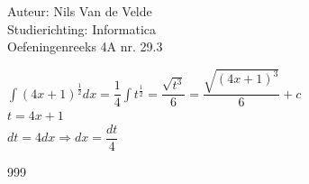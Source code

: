 \documentclass[a4paper]{article}
\begin{document}
  
\noindent \large Auteur: Nils Van de Velde \\
\noindent \large Studierichting: Informatica\\
\noindent \large Oefeningenreeks 4A nr. 29.3\\

\medskip

\normalsize

$\displaystyle\int(4x+1)^{\tfrac{1}{2}}dx=\dfrac{1}{4}\displaystyle\int t^{\tfrac{1}{2}} = \dfrac{\sqrt{t^3}}{6} = \dfrac{\sqrt{(4x+1)^3}}{6}+c$\\

$t=4x+1$\\

$dt=4dx\Rightarrow dx=\dfrac{dt}{4}$\\

\begin{thebibliography}{999}
\end{thebibliography}
\end{document}
